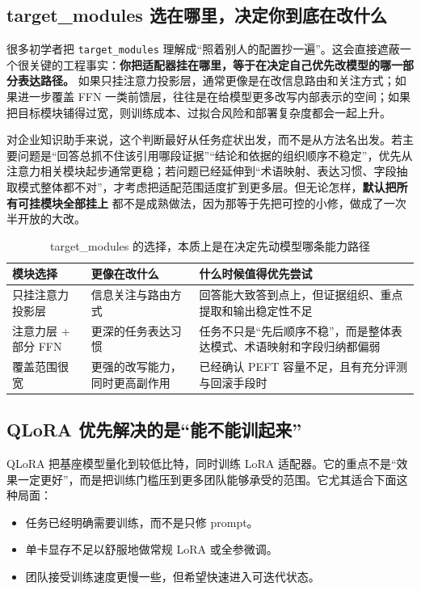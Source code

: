 \subsection{target\_modules 选在哪里，决定你到底在改什么}
很多初学者把 \texttt{target\_modules} 理解成“照着别人的配置抄一遍”。这会直接遮蔽一个很关键的工程事实：\textbf{你把适配器挂在哪里，等于在决定自己优先改模型的哪一部分表达路径。} 如果只挂注意力投影层，通常更像是在改信息路由和关注方式；如果进一步覆盖 FFN 一类前馈层，往往是在给模型更多改写内部表示的空间；如果把目标模块铺得过宽，则训练成本、过拟合风险和部署复杂度都会一起上升。

对企业知识助手来说，这个判断最好从任务症状出发，而不是从方法名出发。若主要问题是“回答总抓不住该引用哪段证据”“结论和依据的组织顺序不稳定”，优先从注意力相关模块起步通常更稳；若问题已经延伸到“术语映射、表达习惯、字段抽取模式整体都不对”，才考虑把适配范围适度扩到更多层。但无论怎样，\textbf{默认把所有可挂模块全部挂上} 都不是成熟做法，因为那等于先把可控的小修，做成了一次半开放的大改。

\begin{table}[H]
\centering
\small
\begin{tabularx}{\textwidth}{>{\raggedright\arraybackslash}p{3cm}>{\raggedright\arraybackslash}p{3cm}>{\raggedright\arraybackslash}X}
\toprule
\textbf{模块选择} & \textbf{更像在改什么} & \textbf{什么时候值得优先尝试} \\
\midrule
只挂注意力投影层 & 信息关注与路由方式 & 回答能大致答到点上，但证据组织、重点提取和输出稳定性不足 \\
注意力层 + 部分 FFN & 更深的任务表达习惯 & 任务不只是“先后顺序不稳”，而是整体表达模式、术语映射和字段归纳都偏弱 \\
覆盖范围很宽 & 更强的改写能力，同时更高副作用 & 已经确认 PEFT 容量不足，且有充分评测与回滚手段时 \\
\bottomrule
\end{tabularx}
\caption{target\_modules 的选择，本质上是在决定先动模型哪条能力路径}
\label{tab:lora-target-modules}
\end{table}

\subsection{QLoRA 优先解决的是“能不能训起来”}
QLoRA 把基座模型量化到较低比特，同时训练 LoRA 适配器。它的重点不是“效果一定更好”，而是把训练门槛压到更多团队能够承受的范围。它尤其适合下面这种局面：
\begin{itemize}
  \item 任务已经明确需要训练，而不是只修 prompt。
  \item 单卡显存不足以舒服地做常规 LoRA 或全参微调。
  \item 团队接受训练速度更慢一些，但希望快速进入可迭代状态。
\end{itemize}

